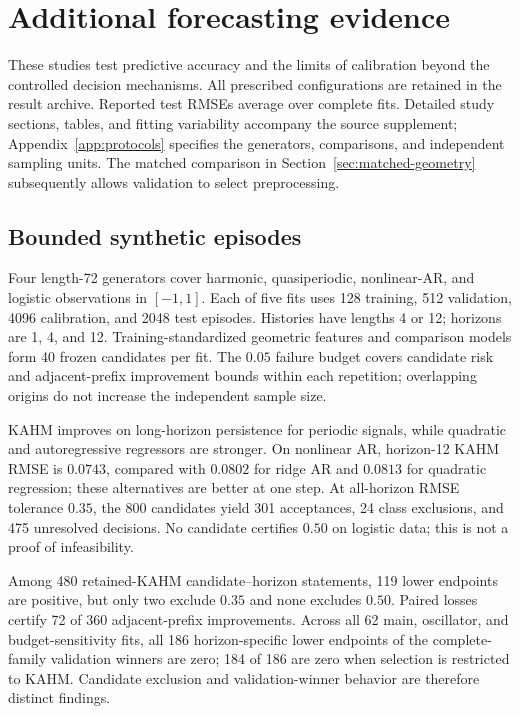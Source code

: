 \section{Additional forecasting evidence}
\label{sec:experiments}

These studies test predictive accuracy and the limits of calibration beyond
the controlled decision mechanisms. All prescribed configurations are retained
in the result archive. Reported test RMSEs average over complete fits.
Detailed study sections, tables, and fitting variability accompany the source
supplement; Appendix~\ref{app:protocols} specifies the generators, comparisons,
and independent sampling units. The matched comparison in
Section~\ref{sec:matched-geometry} subsequently allows validation to select
preprocessing.

\subsection{Bounded synthetic episodes}

Four length-72 generators cover harmonic, quasiperiodic, nonlinear-AR, and
logistic observations in $[-1,1]$. Each of five fits uses 128 training,
512 validation, 4096 calibration, and 2048 test episodes. Histories have
lengths 4 or 12; horizons are 1, 4, and 12. Training-standardized geometric
features and comparison models form 40 frozen candidates per fit. The
$0.05$ failure budget covers candidate risk and adjacent-prefix improvement
bounds within each repetition; overlapping origins do not increase the
independent sample size.

KAHM improves on long-horizon persistence for periodic signals, while
quadratic and autoregressive regressors are stronger. On nonlinear AR,
horizon-12 KAHM RMSE is $0.0743$, compared with $0.0802$ for ridge AR and
$0.0813$ for quadratic regression; these alternatives are better at one step.
At all-horizon RMSE tolerance $0.35$, the 800 candidates yield 301 acceptances,
24 class exclusions, and 475 unresolved decisions. No candidate certifies
$0.50$ on logistic data; this is not a proof of infeasibility.

Among 480 retained-KAHM candidate--horizon statements, 119 lower endpoints
are positive, but only two exclude $0.35$ and none excludes $0.50$.
Paired losses certify 72 of 360 adjacent-prefix improvements. Across all
62 main, oscillator, and budget-sensitivity fits, all 186 horizon-specific
lower endpoints of the complete-family validation winners are zero; 184 of
186 are zero when selection is restricted to KAHM. Candidate exclusion and
validation-winner behavior are therefore distinct findings.

